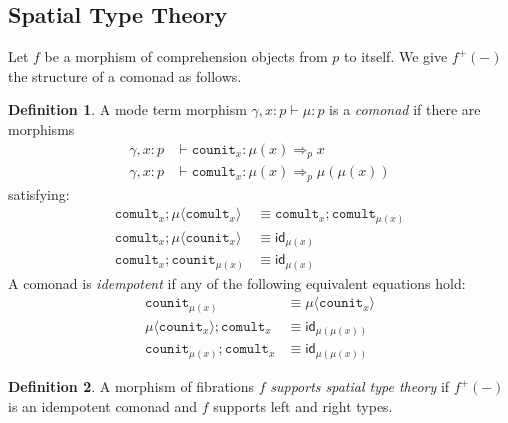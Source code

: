 \documentclass[10pt]{article}
\theoremstyle{definition}
\newtheorem{definition}{Definition}
\newcommand{\yields}{\vdash}
\newcommand{\id}{\mathsf{id}}
\newcommand\TrPlus[2]{\ensuremath{{#1}^+(#2)}}
\newcommand\ap[2]{\ensuremath{#1 \langle #2 \rangle }}
\newcommand\fcomult[1]{\ensuremath{\mathtt{comult}_{#1}}}
\newcommand\fcounit[1]{\ensuremath{\mathtt{counit}_{#1}}}
\begin{document}
\subsection{Spatial Type Theory}

Let $f$ be a morphism of comprehension objects from $p$ to itself. We give $\TrPlus{f}{-}$ the structure of a comonad as follows.

\begin{definition}
A mode term morphism $\gamma, x : p \yields \mu : p$ is a \emph{comonad} if there are morphisms
\begin{align*}
\gamma, x : p &\yields \fcounit{x} : \mu(x) \Rightarrow_p x \\
\gamma, x : p &\yields \fcomult{x} : \mu(x) \Rightarrow_p \mu(\mu(x))
\end{align*}
satisfying:
\begin{align}
\fcomult{x};\ap{\mu}{\fcomult{x}} &\equiv \fcomult{x};\fcomult{\mu(x)} \\
\fcomult{x};\ap{\mu}{\fcounit{x}} &\equiv \id_{\mu(x)} \\
\fcomult{x};\fcounit{\mu(x)} &\equiv \id_{\mu(x)}
\end{align}
A comonad is \emph{idempotent} if any of the following equivalent equations hold:
\begin{align}
\fcounit{\mu(x)} &\equiv \ap{\mu}{\fcounit{x}} \\
\ap{\mu}{\fcounit{x}} ; \fcomult{x} &\equiv \id_{\mu(\mu(x))} \\
\fcounit{\mu(x)} ; \fcomult{x} &\equiv \id_{\mu(\mu(x))} 
\end{align}
\end{definition}

\begin{definition}\label{def:supports-spatial}
A morphism of fibrations $f$ \emph{supports spatial type theory} if $\TrPlus{f}{-}$ is an idempotent comonad and $f$ supports left and right types.
\end{definition}
\end{document}

